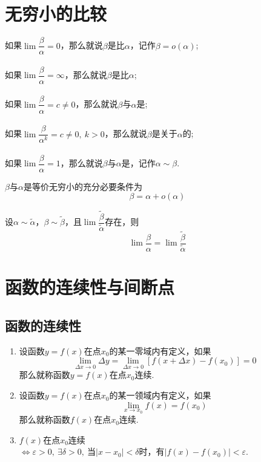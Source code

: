 \documentclass[lang=cn,10pt]{elegantbook}
\begin{document}
\section{无穷小的比较}
\begin{definition}
	如果\( \lim \dfrac{\beta}{\alpha} = 0 \)，那么就说\( \beta \)是比\( \alpha \)，记作\( \beta = o(\alpha) \);\\\\
	如果\( \lim \dfrac{\beta}{\alpha} = \infty \)，那么就说\( \beta \)是比\( \alpha \);\\\\
	如果\( \lim \dfrac{\beta}{\alpha} = c \neq 0 \)，那么就说\( \beta \)与\( \alpha \)是;\\\\
	如果\( \lim \dfrac{\beta}{\alpha^{k}} = c \neq 0,\ k > 0 \)，那么就说\( \beta \)是关于\( \alpha \)的;\\\\
	如果\( \lim \dfrac{\beta}{\alpha} = 1 \)，那么就说\( \beta \)与\( \alpha \)是，记作\( \alpha \sim \beta \).
\end{definition}

\begin{theorem}
	\( \beta \)与\( \alpha \)是等价无穷小的{\heiti 充分必要条件}为
	\[ \beta = \alpha + o(\alpha) \]
\end{theorem}

\begin{theorem}
	设\( \alpha \sim \widetilde{\alpha} \)，\( \beta \sim \widetilde{\beta} \)，且\( \lim \dfrac{\widetilde{\beta}}{\widetilde{\alpha}} \)存在，则
	\[ \lim\dfrac{\beta}{\alpha} = \lim\dfrac{\widetilde{\beta}}{\widetilde{\alpha}} \]
\end{theorem}

\section{函数的连续性与间断点}

\subsection{函数的连续性}
\begin{definition}
	\begin{enumerate}
		\item 设函数\( y = f(x) \)在点\( x_{0} \)的某一零域内有定义，如果
		\[ \lim\limits_{\Delta x \to 0}\Delta y = \lim\limits_{\Delta x \to 0}[f(x + \Delta x) - f(x_{0})] = 0 \]
		那么就称函数\( y = f(x) \)在点\( x_{0} \)连续.
		\item 设函数\( y = f(x) \)在点\( x_{0} \)的某一领域内有定义，如果
		\[ \lim\limits_{x \to x_{0}}f(x) = f(x_{0}) \]
		那么就称函数\( f(x) \)在点\( x_{0} \)连续.
		\item \( f(x) \)在点\( x_{0} \)连续\( \Leftrightarrow \varepsilon > 0,\ \exists \delta > 0,\ \text{当}| x - x_{0}|< \delta \text{时，有}|f(x) - f(x_{0})| < \varepsilon \).
	\end{enumerate}
\end{definition}
\end{document}

